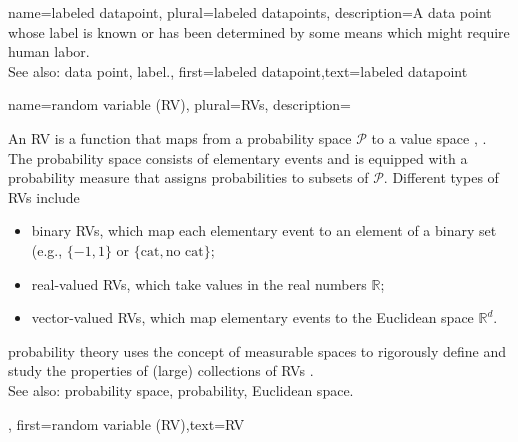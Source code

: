 {name={labeled datapoint}, plural={labeled datapoints},
 description={A data point whose label is known or has been determined 
 	by some means which might require human labor.
			\\
		See also: data point, label.},
 first={labeled datapoint},text={labeled datapoint}  
}

{name={random variable (RV)}, plural={RVs},
 description={An RV is a function that maps from 
 	a probability space $\mathcal{P}$ to a value space \cite{GrayProbBook}, \cite{BillingsleyProbMeasure}. 
 	The probability space consists of elementary events and is equipped with a probability 
 	measure that assigns probabilities to subsets of $\mathcal{P}$. 
 	Different types of RVs include  
 	\begin{itemize} 
 	\item {binary RVs}, which map each elementary event to an element of a binary set (e.g., $\{-1,1\}$ or $\{\text{cat}, \text{no cat}\}$; 
 	\item {real-valued RVs}, which take values in the real numbers $\mathbb{R}$;  
 	\item {vector-valued RVs}, which map elementary events to the Euclidean space $\mathbb{R}^{d}$.  
 	\end{itemize} 
 	\Gls{probability} theory uses the concept of measurable spaces to rigorously define 
 	and study the properties of (large) collections of RVs \cite{BillingsleyProbMeasure}.
			\\
		See also: probability space, probability, Euclidean space.}, first={random variable (RV)},text={RV}  }
 
